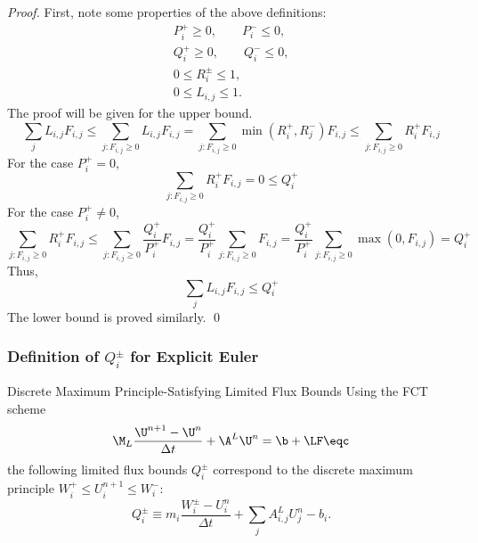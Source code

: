 \begin{proof}
   First, note some properties of the above definitions:
   \begin{gather*}
      P_i^+ \geq 0, \qquad P_i^- \leq 0,\\
      Q_i^+ \geq 0, \qquad Q_i^- \leq 0,\\
      0 \leq R_i^\pm \leq 1,\\
      0 \leq L_{i,j} \leq 1.
   \end{gather*}
   The proof will be given for the upper bound.
   \[
      \sum\limits_j L_{i,j}F_{i,j}
         \leq \sum\limits_{j:F_{i,j}\geq 0} L_{i,j}F_{i,j}
         = \sum\limits_{j:F_{i,j}\geq 0} \min(R_i^+,R_j^-)F_{i,j}
         \leq \sum\limits_{j:F_{i,j}\geq 0} R_i^+ F_{i,j}
   \]
   For the case $P_i^+ = 0$,
   \[
      \sum\limits_{j:F_{i,j}\geq 0} R_i^+ F_{i,j} = 0 \leq Q_i^+
   \]
   For the case $P_i^+ \ne 0$,
   \[
      \sum\limits_{j:F_{i,j}\geq 0} R_i^+ F_{i,j}
      \leq \sum\limits_{j:F_{i,j}\geq 0}\frac{Q_i^+}{P_i^+} F_{i,j}
      = \frac{Q_i^+}{P_i^+} \sum\limits_{j:F_{i,j}\geq 0} F_{i,j}
      = \frac{Q_i^+}{P_i^+} \sum\limits_{j:F_{i,j}\geq 0} \max(0,F_{i,j})
      = Q_i^+
   \]
   Thus,
   \[
      \sum\limits_j L_{i,j}F_{i,j} \leq Q_i^+
   \]
   The lower bound is proved similarly.
   \qed
\end{proof}
\subsubsection{Definition of $Q_i^\pm$ for Explicit Euler}
\begin{theorem}{Discrete Maximum Principle-Satisfying Limited Flux Bounds}
   Using the FCT scheme
   \begin{equation}\label{FCTscheme}
      \M_L\frac{\U^{n+1}-\U^n}{\Delta t}
         + \A^L\U^n
         = \b + \LF \eqc
   \end{equation}
   the following limited flux bounds $Q_i^\pm$ correspond to the discrete
   maximum principle $W_i^+\le U_i^{n+1}\le W_i^-$:
   \begin{equation}\label{Q_ex}
      Q_i^\pm \equiv m_i\frac{W_i^\pm-U_i^n}{\Delta t}
      + \sum\limits_j A_{i,j}^L U_j^n - b_i.
   \end{equation}
\end{theorem}

